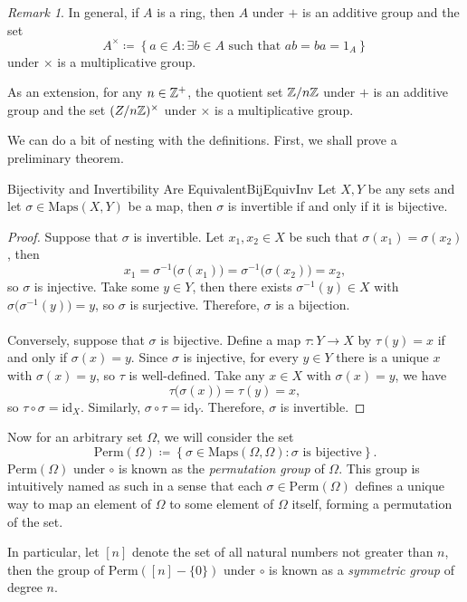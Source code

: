 \documentclass[math, code]{amznotes}
\theoremstyle{remark}
\newtheorem*{remark}{Remark}
\begin{document}
\begin{notebox}
    \begin{remark}
        In general, if $A$ is a ring, then $A$ under $+$ is an additive group and the set
        \begin{equation*}
            A^{\times} \coloneqq \left\{a \in A \colon \exists b \in A \textrm{ such that } ab = ba = 1_A\right\}
        \end{equation*}
        under $\times$ is a multiplicative group. 
    \end{remark}
\end{notebox}
As an extension, for any $n \in \mathbb{Z}^+$, the quotient set $\mathbb{Z}/n\mathbb{Z}$ under $+$ is an additive group and the set $(Z/n\mathbb{Z})^{\times}$ under $\times$ is a multiplicative group.

We can do a bit of nesting with the definitions. First, we shall prove a preliminary theorem.
\begin{thmbox}{Bijectivity and Invertibility Are Equivalent}{BijEquivInv}
    Let $X, Y$ be any sets and let $\sigma \in \mathrm{Maps}(X, Y)$ be a map, then $\sigma$ is invertible if and only if it is bijective.
    \tcblower
    \begin{proof}
        Suppose that $\sigma$ is invertible. Let $x_1, x_2 \in X$ be such that $\sigma(x_1) = \sigma(x_2)$, then 
        \begin{equation*}
            x_1 = \sigma^{-1}\bigl(\sigma(x_1)\bigr) = \sigma^{-1}\bigl(\sigma(x_2)\bigr) = x_2,
        \end{equation*}
        so $\sigma$ is injective. Take some $y \in Y$, then there exists $\sigma^{-1}(y) \in X$ with $\sigma\bigl(\sigma^{-1}(y)\bigr) = y$, so $\sigma$ is surjective. Therefore, $\sigma$ is a bijection.
        \\\\
        Conversely, suppose that $\sigma$ is bijective. Define a map $\tau \colon Y \to X$ by $\tau(y) = x$ if and only if $\sigma(x) = y$. Since $\sigma$ is injective, for every $y \in Y$ there is a unique $x$ with $\sigma(x) = y$, so $\tau$ is well-defined. Take any $x \in X$ with $\sigma(x) = y$, we have
        \begin{equation*}
            \tau\bigl(\sigma(x)\bigr) = \tau(y) = x,
        \end{equation*}
        so $\tau \circ \sigma = \mathrm{id}_X$. Similarly, $\sigma \circ \tau = \mathrm{id}_Y$. Therefore, $\sigma$ is invertible.
    \end{proof}
\end{thmbox}
Now for an arbitrary set $\Omega$, we will consider the set 
\begin{equation*}
    \mathrm{Perm}(\Omega) \coloneqq \left\{\sigma \in \mathrm{Maps}(\Omega, \Omega) \colon \sigma \textrm{ is bijective}\right\}.
\end{equation*}
$\mathrm{Perm}(\Omega)$ under $\circ$ is known as the \textit{permutation group} of $\Omega$. This group is intuitively named as such in a sense that each $\sigma \in \mathrm{Perm}(\Omega)$ defines a unique way to map an element of $\Omega$ to some element of $\Omega$ itself, forming a permutation of the set. 

In particular, let $[n]$ denote the set of all natural numbers not greater than $n$, then the group of $\mathrm{Perm}([n] - \{0\})$ under $\circ$ is known as a \textit{symmetric group} of degree $n$.
\end{document}
